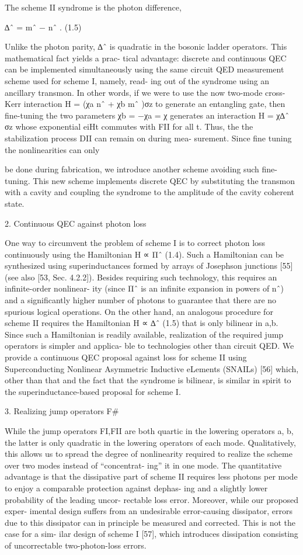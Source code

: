 \documentclass[12]{amsart}
\newcommand\0{\mathbf{0}}
\newcommand\<{\langle}
\renewcommand\>{\rangle}
\begin{document}
The scheme II syndrome is the photon difference,

∆ˆ = mˆ − nˆ . (1.5)

Unlike the photon parity, ∆ˆ is quadratic in the bosonic ladder operators. This mathematical fact yields a prac- tical advantage: discrete and continuous QEC can be implemented simultaneously using the same circuit QED measurement scheme used for scheme I, namely, read- ing out of the syndrome using an ancillary transmon. In other words, if we were to use the now two-mode cross-Kerr interaction H = (χa nˆ + χb mˆ )σz to generate an entangling gate, then fine-tuning the two parameters χb = −χa = χ generates an interaction H = χ∆ˆ σz whose exponential eiHt commutes with FII for all t. Thus, the the stabilization process DII can remain on during mea- surement. Since fine tuning the nonlinearities can only

be done during fabrication, we introduce another scheme avoiding such fine-tuning. This new scheme implements discrete QEC by substituting the transmon with a cavity and coupling the syndrome to the amplitude of the cavity coherent state.

2. Continuous QEC against photon loss

One way to circumvent the problem of scheme I is to correct photon loss continuously using the Hamiltonian H ∝ Πˆ (1.4). Such a Hamiltonian can be synthesized using superinductances formed by arrays of Josephson junctions [55] (see also [53, Sec. 4.2.2]). Besides requiring such technology, this requires an infinite-order nonlinear- ity (since Πˆ is an infinite expansion in powers of nˆ) and a significantly higher number of photons to guarantee that there are no spurious logical operations. On the other hand, an analogous procedure for scheme II requires the Hamiltonian H ∝ ∆ˆ (1.5) that is only bilinear in a,b. Since such a Hamiltonian is readily available, realization of the required jump operators is simpler and applica- ble to technologies other than circuit QED. We provide a continuous QEC proposal against loss for scheme II using Superconducting Nonlinear Asymmetric Inductive eLements (SNAILs) [56] which, other than that and the fact that the syndrome is bilinear, is similar in spirit to the superinductance-based proposal for scheme I.

3. Realizing jump operators F\#

While the jump operators FI,FII are both quartic in the lowering operators a, b, the latter is only quadratic in the lowering operators of each mode. Qualitatively, this allows us to spread the degree of nonlinearity required to realize the scheme over two modes instead of “concentrat- ing” it in one mode. The quantitative advantage is that the dissipative part of scheme II requires less photons per mode to enjoy a comparable protection against dephas- ing and a slightly lower probability of the leading uncor- rectable loss error. Moreover, while our proposed exper- imental design suffers from an undesirable error-causing dissipator, errors due to this dissipator can in principle be measured and corrected. This is not the case for a sim- ilar design of scheme I [57], which introduces dissipation consisting of uncorrectable two-photon-loss errors.
\end{document}
